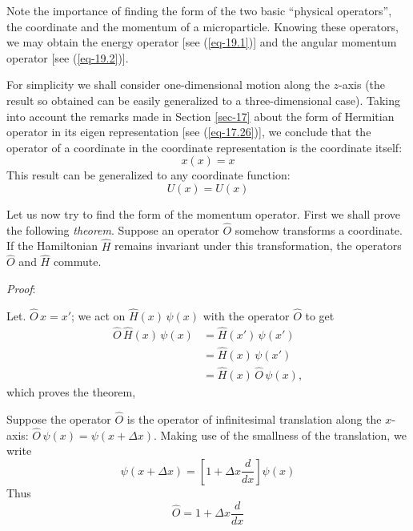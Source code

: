 \documentclass[a4paper,sfsidenotes,colorlinks=true]{tufte-book}
\numberwithin{equation}{section}
\numberwithin{figure}{section}
\begin{document}
Note the importance of finding the form of the two basic ``physical
operators'', the coordinate and the momentum of a
microparticle. Knowing these operators, we may obtain the energy
operator [see (\ref{eq-19.1})] and the angular momentum operator [see
(\ref{eq-19.2})].

For simplicity we
shall consider one-dimensional motion along the $z$-axis (the result
so obtained can be easily generalized to a three-dimensional
case). Taking into account the remarks made in Section \ref{sec-17}
about the form of Hermitian operator in its eigen representation [see
(\ref{eq-17.26})], we conclude that the operator of a coordinate in
the coordinate representation is the coordinate itself: 
\begin{equation}
x (x) = x 
\label{eq-20.1} 
\end{equation}
This result can be generalized to any coordinate function: 
\begin{equation}
U (x) = U(x)
\label{eq-20.2} 
\end{equation}


Let us now try to find the form of the momentum operator. First we
shall prove the following \emph{theorem}. Suppose an operator
$\hat{O}$ somehow transforms a coordinate. If the Hamiltonian $\hat{H}$
remains invariant under this transformation, the operators $\hat{O}$ and $\hat{H}$
commute. 

\emph{Proof}: 

Let. $\hat{O} \, x = x'$; we act on $\hat{H}(x) \,\psi (x)$ with the
operator $\hat{O}$ to get
\begin{align*} 
\hat{O} \, \hat{H}(x) \, \psi(x) & = \hat{H}(x') \, \psi (x')  \\
& = \hat{H}(x) \, \psi (x')\\
&= \hat{H}(x) \, \hat{O} \, \psi (x), 
\end{align*}
which proves the theorem, 

Suppose the operator $\hat{O}$ is the operator of infinitesimal
translation along the $x$-axis:
$\hat{O} \, \psi(x) = \psi (x + \Delta x)$. Making use of the
smallness of the translation, we write
\begin{equation*}
\psi (x + \Delta x) = \left[ 1 + \Delta x \frac{d}{dx} \right] \psi (x)
\end{equation*}
Thus 
\begin{equation*}
\hat{O} = 1 + \Delta x \frac{d}{dx}
\end{equation*}
\end{document}
